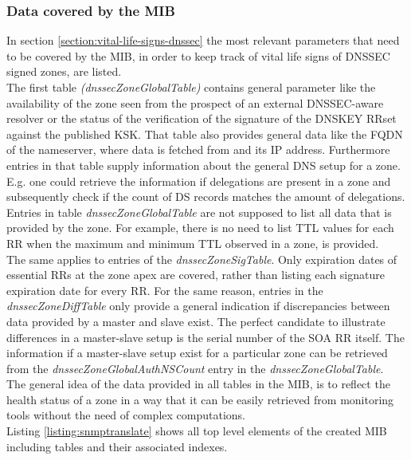 \subsubsection{Data covered by the MIB}
In section \ref{section:vital-life-signs-dnssec} the most relevant parameters that need to be covered by the MIB, in order to keep track of vital life signs of DNSSEC signed zones, are listed. 
\\
The first table \textit{(dnssecZoneGlobalTable)} contains general parameter like the availability of the zone seen from the prospect of an external DNSSEC-aware resolver or the status of the verification of the signature of the DNSKEY RRset against the published KSK. That table also provides general data like the FQDN of the nameserver, where data is fetched from and its IP address. Furthermore entries in that table supply information about the general DNS setup for a zone. E.g. one could retrieve the information if delegations are present in a zone and subsequently check if the count of DS records matches the amount of delegations. 
\\
Entries in table \textit{dnssecZoneGlobalTable} are not supposed to list all data that is provided by the zone. For example, there is no need to list TTL values for each RR when the maximum and minimum TTL observed in a zone, is provided. 
\\
The same applies to entries of the \textit{dnssecZoneSigTable}. Only expiration dates of essential RRs at the zone apex are covered, rather than listing each signature expiration date for every RR. For the same reason, entries in the \textit{dnssecZoneDiffTable} only provide a general indication if discrepancies between data provided by a master and slave exist. The perfect candidate to illustrate differences in a master-slave setup is the serial number of the SOA RR itself. The information if a master-slave setup exist for a particular zone can be retrieved from the \textit{dnssecZoneGlobalAuthNSCount} entry in the \textit{ dnssecZoneGlobalTable}.
\\
The general idea of the data provided in all tables in the MIB, is to reflect the health status of a zone in a way that it can be easily retrieved from monitoring tools without the need of complex computations.
\\
Listing \ref{listing:snmptranslate} shows all top level elements of the created MIB including tables and their associated indexes.

